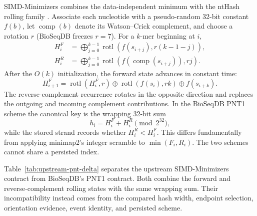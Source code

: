 SIMD-Minimizers combines the data-independent minimum with the ntHash rolling
family \cite{nthash_2016,groot_koerkamp_simd_minimizers_2025}. Associate each
nucleotide with a pseudo-random 32-bit constant $f(b)$, let
\(\operatorname{comp}(b)\) denote its Watson--Crick complement, and choose a
rotation $r$ (BioSeqDB freezes $r=7$). For a $k$-mer beginning at $i$,
\[
\begin{aligned}
 H^F_i &= \bigoplus_{j=0}^{k-1}
       \operatorname{rotl}\!\left(f(s_{i+j}),r(k-1-j)\right),\\
 H^R_i &= \bigoplus_{j=0}^{k-1}
       \operatorname{rotl}\!\left(f(\operatorname{comp}(s_{i+j})),rj\right).
\end{aligned}
\]
After the $O(k)$ initialization, the forward state advances in constant time:
\[
 H^F_{i+1}=
 \operatorname{rotl}(H^F_i,r)
 \oplus \operatorname{rotl}(f(s_i),rk)
 \oplus f(s_{i+k}).
\]
The reverse-complement recurrence rotates in the opposite direction and
replaces the outgoing and incoming complement contributions.  In the
BioSeqDB PNT1 scheme the canonical key is the wrapping 32-bit sum
\[
  h_i=H^F_i+H^R_i \pmod {2^{32}},
\]
while the stored strand records whether $H^R_i<H^F_i$.  This differs
fundamentally from applying minimap2's integer scramble to
$\min(F_i,R_i)$. The two schemes cannot share a persisted index.

\clearpage
\begingroup
\raggedbottom
Table~\ref{tab:upstream-pnt-delta} separates the upstream
SIMD-Minimizers contract from BioSeqDB's PNT1 contract.  Both combine the
forward and reverse-complement rolling states with the same wrapping sum.
Their incompatibility instead comes from the compared hash width, endpoint
selection, orientation evidence, event identity, and persisted scheme.

